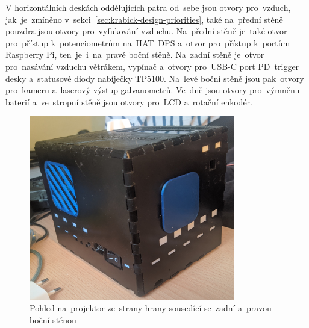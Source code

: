 V horizontálních deskách oddělujících patra od~sebe jsou otvory pro~vzduch, jak~je~zmíněno v~sekci~\ref{sec:krabick-design-priorities}, také na~přední stěně pouzdra jsou otvory pro~vyfukování vzduchu. Na~přední stěně je~také otvor pro~přístup k~potenciometrům na~HAT~DPS a~otvor pro~přístup k~portům Raspberry Pi, ten~je~i~na~pravé boční stěně.
Na~zadní stěně je~otvor pro~nasávání vzduchu větrákem, vypínač a~otvory pro~USB-C port PD~trigger desky a~statusové diody nabíječky TP5100. Na~levé boční stěně jsou pak~otvory pro~kameru a~laserový výstup galvanometrů. Ve~dně jsou otvory pro~výmněnu baterií a~ve~stropní stěně jsou otvory pro~LCD a~rotační enkodér.

\begin{figure}[htb]
  \centering
  \includegraphics[width=0.8\textwidth]{img/hw_sides_backleft.jpg}
  \caption{\label{fig:hw_sides_backleft.jpg} Pohled na~projektor ze~strany hrany sousedící se~zadní a~pravou boční stěnou}
\end{figure}


